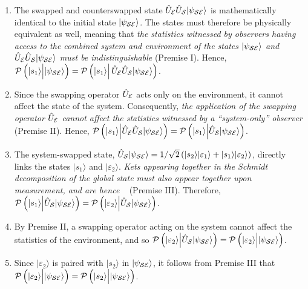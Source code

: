 \documentclass[12pt]{iopart}
\begin{document}
\begin{enumerate}
\item The swapped and counterswapped state $\hat{U}_{\cal{E}} \hat{U}_{\cal{S}}|\psi_{\cal SE}\rangle$ is mathematically identical to the initial state $|\psi_{\cal SE}\rangle$. The states must therefore be physically equivalent as well, meaning that \textit{the statistics witnessed by observers having access to the combined system and environment of the states $|\psi_{\cal SE}\rangle$ and $\hat{U}_{\cal{E}} \hat{U}_{\cal{S}}|\psi_{\cal SE}\rangle$ must be indistinguishable} (Premise I). Hence, ${\cal P}\left(|s_1\rangle {\Big |} |\psi_{\cal SE} \rangle \right) = {\cal P}\left(|s_1\rangle {\Big |} \, \hat{U}_{\cal{E}} \hat{U}_{\cal{S}} |\psi_{\cal SE} \rangle \right)$.

\item Since the swapping operator $\hat{U}_{\cal{E}}$ acts only on the environment, it cannot affect the state of the system. Consequently, \textit{the application of the swapping operator $\hat{U}_{\cal{E}}$ cannot affect the statistics witnessed by a ``system-only'' observer} (Premise II). Hence, ${\cal P}\left(|s_1\rangle {\Big |} \hat{U}_{\cal{E}} \hat{U}_{\cal{S}} |\psi_{\cal SE} \rangle \right)={\cal P}\left(|s_1\rangle {\Big |}\hat{U}_{\cal{S}} |\psi_{\cal SE} \rangle \right)$.

\item The system-swapped state, $\hat{U}_{\cal{S}} |\psi_{\cal SE}\rangle=1/\sqrt{2}\left(|s_2\rangle |\varepsilon_1\rangle + |s_1\rangle|\varepsilon_2\rangle \right)$, directly links the states $|s_1\rangle$ and $|\varepsilon_2\rangle$. \textit{Kets appearing together in the Schmidt decomposition of the global state must also appear together upon measurement, and are hence }~\cite{footnote:02} (Premise III). Therefore, ${\cal P}\left(|s_1\rangle {\Big |}\hat{U}_{\cal S} |\psi_{\cal SE}\rangle \right) = {\cal P}\left(|\varepsilon_2\rangle {\Big |} \hat{U}_{\cal S} |\psi_{\cal SE}\rangle \right)$.

\item By Premise II, a swapping operator acting on the system cannot affect the statistics of the environment, and so ${\cal P}\left(|\varepsilon_2\rangle {\Big |} \hat{U}_{\cal S} |\psi_{\cal SE}\rangle \right)= {\cal P}\left(|\varepsilon_2\rangle {\Big |} |\psi_{\cal SE}\rangle \right)$.

\item Since $|\varepsilon_2\rangle$ is paired with $|s_2\rangle$ in $|\psi_{\cal SE}\rangle$, it follows from Premise III that ${\cal P}\left(|\varepsilon_2\rangle {\Big |} |\psi_{\cal SE} \rangle \right)={\cal P}\left(|s_2\rangle {\Big |} |\psi_{\cal SE} \rangle \right)$.
\end{enumerate}
\end{document}
